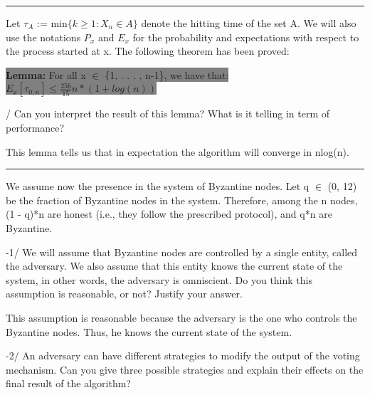 \documentclass[11pt]{article}
\begin{document}
\begin{center}
    \noindent\rule{8cm}{0.4pt} 
\end{center}


\noindent Let $\tau_{A}$ := min$\{k \geq 1 : X_{n} \in A\}$ denote the hitting time of the set A. We will also use the
notations $P_{x}$ and $E_{x}$ for the probability and expectations with respect to the process started at x. The
following theorem has been proved:
\begin{center}
    \colorbox{Gray}{\textbf{Lemma:} For all x $\in$ \{1, . . . , n-1\}, we have that: $E_{x}[\tau_{0,n}] \leq \frac{256}{15}n*(1 + log(n))$}
\end{center}

\vspace{5mm}

/ Can you interpret the result of this lemma? What is it telling in term of performance?

\vspace{5mm}

This lemma tells us that in expectation the algorithm will converge in nlog(n).

\begin{center}
    \noindent\rule{8cm}{0.4pt} 
\end{center}

We assume now the presence in the system of Byzantine nodes. Let q $\in$ (0, 12) be the fraction
of Byzantine nodes in the system. Therefore, among the n nodes, (1 - q)*n are honest (i.e., they follow
the prescribed protocol), and q*n are Byzantine.

\vspace{5mm}

-1/ We will assume that Byzantine nodes are controlled by a single entity, called the adversary. We
also assume that this entity knows the current state of the system, in other words, the adversary
is omniscient. Do you think this assumption is reasonable, or not? Justify your answer. 

\vspace{5mm}

This assumption is reasonable because the adversary is the one who controls the Byzantine nodes. Thus, he knows the current state of the system.

\vspace{5mm}

-2/ An adversary can have different strategies to modify the output of the voting mechanism. Can
you give three possible strategies and explain their effects on the final result of the algorithm?
\end{document}
